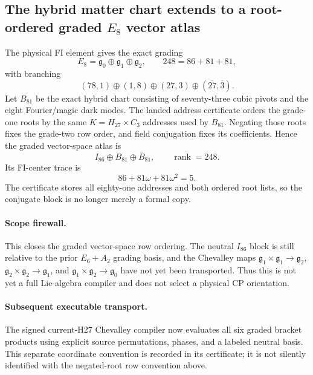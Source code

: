 \subsection*{The hybrid matter chart extends to a root-ordered graded $E_8$ vector atlas}

The physical FI element gives the exact grading
\[
E_8=\mathfrak g_0\oplus\mathfrak g_1\oplus\mathfrak g_2,
\qquad
248=86+81+81,
\]
with branching
\[
(78,1)\oplus(1,8)\oplus(27,3)\oplus(\overline{27},\overline3).
\]
Let $B_{81}$ be the exact hybrid chart consisting of seventy-three cubic
pivots and the eight Fourier/magic dark modes.  The landed address certificate
orders the grade-one roots by the same $K=H_{27}\times C_3$ addresses used by
$B_{81}$.  Negating those roots fixes the grade-two row order, and field
conjugation fixes its coefficients.  Hence the graded vector-space atlas is
\[
\boxed{I_{86}\oplus B_{81}\oplus\overline{B}_{81}},
\qquad \operatorname{rank}=248.
\]
Its FI-center trace is
\[
86+81\omega+81\omega^2=5.
\]
The certificate stores all eighty-one addresses and both ordered root lists,
so the conjugate block is no longer merely a formal copy.

\paragraph{Scope firewall.}
This closes the graded vector-space row ordering.  The neutral $I_{86}$ block
is still relative to the prior $E_6+A_2$ grading basis, and the Chevalley maps
$\mathfrak g_1\times\mathfrak g_1\to\mathfrak g_2$,
$\mathfrak g_2\times\mathfrak g_2\to\mathfrak g_1$, and
$\mathfrak g_1\times\mathfrak g_2\to\mathfrak g_0$ have not yet been
transported.  Thus this is not yet a full Lie-algebra compiler and does not
select a physical CP orientation.

\paragraph{Subsequent executable transport.}
The signed current-H27 Chevalley compiler now evaluates all six graded bracket
products using explicit source permutations, phases, and a labeled neutral
basis. This separate coordinate convention is recorded in its certificate;
it is not silently identified with the negated-root row convention above.
